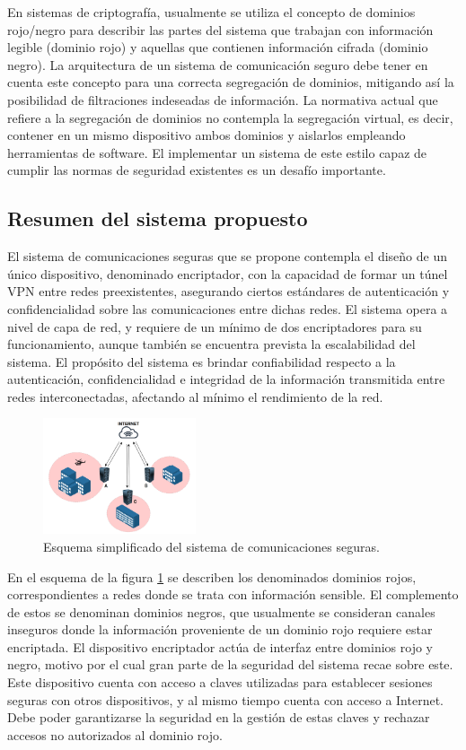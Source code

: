 En sistemas de criptografía, usualmente se utiliza el concepto de dominios rojo/negro para describir las partes del sistema que trabajan con información legible (dominio rojo) y aquellas que contienen información cifrada (dominio negro). La arquitectura de un sistema de comunicación seguro debe tener en cuenta este concepto para una correcta segregación de dominios, mitigando así la posibilidad de filtraciones indeseadas de información. La normativa actual que refiere a la segregación de dominios no contempla la segregación virtual, es decir, contener en un mismo dispositivo ambos dominios y aislarlos empleando herramientas de software. El implementar un sistema de este estilo capaz de cumplir las normas de seguridad existentes es un desafío importante.



\subsection{Resumen del sistema propuesto}

El sistema de comunicaciones seguras que se propone contempla el diseño de un único dispositivo, denominado encriptador, con la capacidad de formar un túnel VPN entre redes preexistentes, asegurando ciertos estándares de autenticación y confidencialidad sobre las comunicaciones entre dichas redes. El sistema opera a nivel de capa de red, y requiere de un mínimo de dos encriptadores para su funcionamiento, aunque también se encuentra prevista la escalabilidad del sistema.
El propósito del sistema es brindar confiabilidad respecto a la autenticación, confidencialidad e integridad de la información transmitida entre redes interconectadas,  afectando al mínimo el rendimiento de la red.

\begin{figure}[h!]
    \centering    
    \includegraphics[width=0.4\textwidth]{../figs/1_overview.png}
    \caption{Esquema simplificado del sistema de comunicaciones seguras.}
    \label{fig:overview}
\end{figure}

En el esquema de la figura \ref{fig:overview} se describen los denominados dominios rojos, correspondientes a redes donde se trata con información sensible. El complemento de estos se denominan dominios negros, que usualmente se consideran canales inseguros donde la información proveniente de un dominio rojo requiere estar encriptada. 
El dispositivo encriptador actúa de interfaz entre dominios rojo y negro, motivo por el cual gran parte de la seguridad del sistema recae sobre este. Este dispositivo cuenta con acceso a claves utilizadas para establecer sesiones seguras con otros dispositivos, y al mismo tiempo cuenta con acceso a Internet. Debe poder garantizarse la seguridad en la gestión de estas claves y rechazar accesos no autorizados al dominio rojo.

